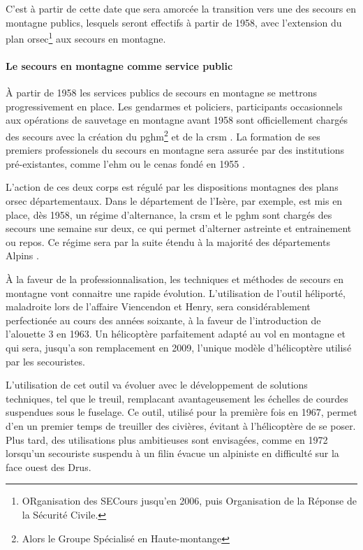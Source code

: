 C'est à partir de cette date que sera amorcée la transition vers une
des secours en montagne publics, lesquels seront effectifs à partir de
1958, avec l'extension du plan \ac{orsec}\footnote{ORganisation des
  SECours jusqu'en 2006, puis Organisation de la Réponse de la
  Sécurité Civile.} aux secours en montagne.

\paragraph{Le secours en montagne comme service public}
\label{par:1-1-1-1-2}

À partir de 1958 les services publics de secours en montagne se
mettrons progressivement en place. Les gendarmes et policiers,
participants occasionnels aux opérations de sauvetage en montagne
avant 1958 sont officiellement chargés des secours avec la création du
\ac{pghm}\footnote{Alors le Groupe Spécialisé en Haute-montange} et de
la \ac{crsm} \autocite{Halle2007}. La formation de ses premiers
professionels du secours en montagne sera assurée par des institutions
pré-existantes, comme l'\ac{ehm} ou le \ac{cenas} fondé en 1955
\autocite{Mezin}.

L'action de ces deux corps est régulé par les dispositions montagnes
des plans \ac{orsec} départementaux. Dans le département de l'Isère,
par exemple, est mis en place, dès 1958, un régime d'alternance, la
\ac{crsm} et le \ac{pghm} sont chargés des secours une semaine sur
deux, ce qui permet d'alterner astreinte et entrainement ou repos. Ce
régime sera par la suite étendu à la majorité des départements Alpins
\autocite{Halle2007}.

À la faveur de la professionnalisation, les techniques et méthodes de
secours en montagne vont connaitre une rapide évolution. L'utilisation
de l'outil héliporté, maladroite lors de l'affaire Viencendon et
Henry, sera considérablement perfectionée au cours des années
soixante, à la faveur de l'introduction de l'alouette 3 en 1963. Un
hélicoptère parfaitement adapté au vol en montagne et qui sera,
jusqu'a son remplacement en 2009, l'unique modèle d'hélicoptère
utilisé par les secouristes.

L'utilisation de cet outil va évoluer avec le développement de
solutions techniques, tel que le treuil, remplacant avantageusement
les échelles de courdes suspendues sous le fuselage. Ce outil, utilisé
pour la première fois en 1967, permet d'en un premier temps de
treuiller des civières, évitant à l'hélicoptère de se poser. Plus
tard, des utilisations plus ambitieuses sont envisagées, comme en 1972
lorsqu'un secouriste suspendu à un filin évacue un alpiniste en
difficulté sur la face ouest des Drus.

